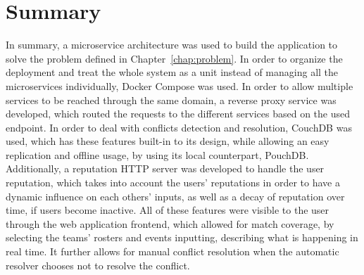 \section{Summary}
In summary, a microservice architecture was used to build the application to solve the problem defined in Chapter~\ref{chap:problem}. In order to organize the deployment and treat the whole system as a unit instead of managing all the microservices individually, Docker Compose was used. In order to allow multiple services to be reached through the same domain, a reverse proxy service was developed, which routed the requests to the different services based on the used endpoint. In order to deal with conflicts detection and resolution, CouchDB was used, which has these features built-in to its design, while allowing an easy replication and offline usage, by using its local counterpart, PouchDB. Additionally, a reputation HTTP server was developed to handle the user reputation, which takes into account the users' reputations in order to have a dynamic influence on each others' inputs, as well as a decay of reputation over time, if users become inactive. All of these features were visible to the user through the web application frontend, which allowed for match coverage, by selecting the teams' rosters and events inputting, describing what is happening in real time. It further allows for manual conflict resolution when the automatic resolver chooses not to resolve the conflict.